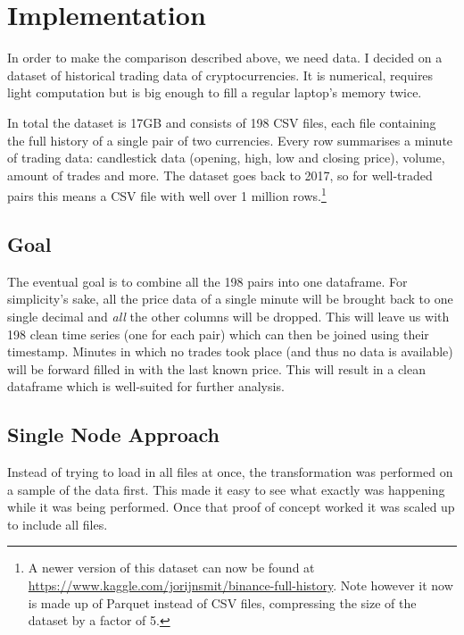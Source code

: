 \section{Implementation}

In order to make the comparison described above, we need data. I decided on a dataset of historical trading data of cryptocurrencies. It is numerical, requires light computation but is big enough to fill a regular laptop's memory twice.

In total the dataset is 17GB and consists of 198 CSV files, each file containing the full history of a single pair of two currencies. Every row summarises a minute of trading data: candlestick data (opening, high, low and closing price), volume, amount of trades and more. The dataset goes back to 2017, so for well-traded pairs this means a CSV file with well over 1 million rows.\footnote{A newer version of this dataset can now be found at \url{https://www.kaggle.com/jorijnsmit/binance-full-history}. Note however it now is made up of Parquet instead of CSV files, compressing the size of the dataset by a factor of 5.}

\subsection{Goal}

The eventual goal is to combine all the 198 pairs into one dataframe. For simplicity's sake, all the price data of a single minute will be brought back to one single decimal and \textit{all} the other columns will be dropped. This will leave us with 198 clean time series (one for each pair) which can then be joined using their timestamp. Minutes in which no trades took place (and thus no data is available) will be forward filled in with the last known price. This will result in a clean dataframe which is well-suited for further analysis.

\subsection{Single Node Approach}

Instead of trying to load in all files at once, the transformation was performed on a sample of the data first. This made it easy to see what exactly was happening while it was being performed. Once that proof of concept worked it was scaled up to include all files.

